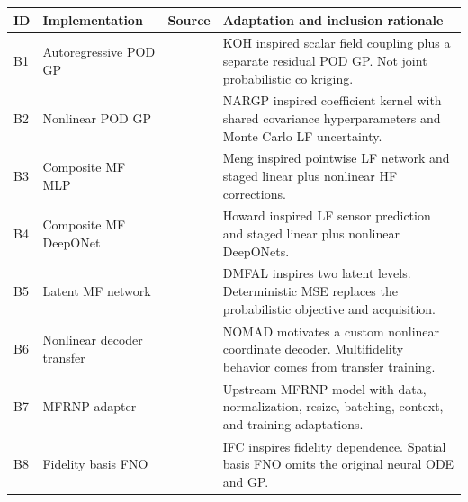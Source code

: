 \begin{tabular}{p{.045\linewidth}p{.20\linewidth}p{.23\linewidth}p{.39\linewidth}}
\toprule
ID & Implementation & Source & Adaptation and inclusion rationale \\
\midrule
B1 & Autoregressive POD GP & \citep{kennedy2000} & KOH inspired scalar field coupling plus a separate residual POD GP. Not joint probabilistic co kriging. \\
B2 & Nonlinear POD GP & \citep{perdikaris2017} & NARGP inspired coefficient kernel with shared covariance hyperparameters and Monte Carlo LF uncertainty. \\
B3 & Composite MF MLP & \citep{meng2020} & Meng inspired pointwise LF network and staged linear plus nonlinear HF corrections. \\
B4 & Composite MF DeepONet & \citep{howard2023} & Howard inspired LF sensor prediction and staged linear plus nonlinear DeepONets. \\
B5 & Latent MF network & \citep{li2022dmfal} & DMFAL inspires two latent levels. Deterministic MSE replaces the probabilistic objective and acquisition. \\
B6 & Nonlinear decoder transfer & \citep{seidman2022} & NOMAD motivates a custom nonlinear coordinate decoder. Multifidelity behavior comes from transfer training. \\
B7 & MFRNP adapter & \citep{niu2024} & Upstream MFRNP model with data, normalization, resize, batching, context, and training adaptations. \\
B8 & Fidelity basis FNO & \citep{li2022ifc} & IFC inspires fidelity dependence. Spatial basis FNO omits the original neural ODE and GP. \\
\bottomrule
\end{tabular}
